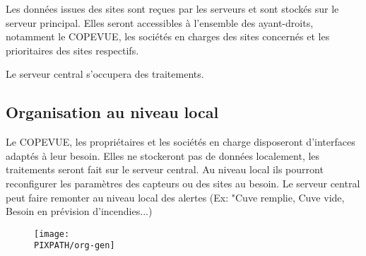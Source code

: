 Les données issues des sites sont reçues par les serveurs et sont stockés
sur le serveur principal. Elles seront accessibles à l'ensemble des
ayant-droits, notamment le COPEVUE, les sociétés en charges des sites
concernés et les prioritaires des sites respectifs. 

Le serveur central s'occupera des traitements. 

\subsection{Organisation au niveau local}

Le COPEVUE, les propriétaires et les sociétés en charge disposeront
d'interfaces adaptés à leur besoin. Elles ne stockeront pas de données
localement, les traitements seront fait sur le serveur central.  Au niveau
local ils pourront reconfigurer les paramètres des capteurs ou des sites au
besoin.  Le serveur central peut faire remonter au niveau local des alertes
(Ex: "Cuve remplie, Cuve vide, Besoin en prévision d'incendies...)



\begin{figure}[!h]
\begin{center}
    \texttt{[image: \\PIXPATH/org-gen]}
\end{center}
\end{figure}
